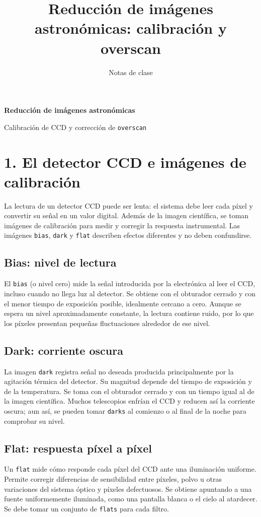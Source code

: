 \documentclass[11pt]{article}
\title{Reducción de imágenes astronómicas: calibración y overscan}
\author{Notas de clase}
\date{}
\begin{document}
\begin{center}
  {\Large\bfseries Reducción de imágenes astronómicas}\par
  {\normalsize Calibración de CCD y corrección de \texttt{overscan}}\par
\end{center}

\section*{1. El detector CCD e imágenes de calibración}

La lectura de un detector CCD puede ser lenta: el sistema debe leer cada píxel y
convertir su señal en un valor digital. Además de la imagen científica, se toman
imágenes de calibración para medir y corregir la respuesta instrumental. Las
imágenes \texttt{bias}, \texttt{dark} y \texttt{flat} describen efectos
diferentes y no deben confundirse.

\subsection*{Bias: nivel de lectura}
El \texttt{bias} (o nivel cero) mide la señal introducida por la electrónica al
leer el CCD, incluso cuando no llega luz al detector. Se obtiene con el obturador
cerrado y con el menor tiempo de exposición posible, idealmente cercano a cero.
Aunque se espera un nivel aproximadamente constante, la lectura contiene ruido,
por lo que los píxeles presentan pequeñas fluctuaciones alrededor de ese nivel.

\begin{center}
  
\end{center}

\subsection*{Dark: corriente oscura}
La imagen \texttt{dark} registra señal no deseada producida principalmente por
la agitación térmica del detector. Su magnitud depende del tiempo de exposición
y de la temperatura. Se toma con el obturador cerrado y con un tiempo igual al
de la imagen científica. Muchos telescopios enfrían el CCD y reducen así la
corriente oscura; aun así, se pueden tomar \texttt{darks} al comienzo o al final
de la noche para comprobar su nivel.

\subsection*{Flat: respuesta píxel a píxel}
Un \texttt{flat} mide cómo responde cada píxel del CCD ante una iluminación
uniforme. Permite corregir diferencias de sensibilidad entre píxeles, polvo u
otras variaciones del sistema óptico y píxeles defectuosos. Se obtiene
apuntando a una fuente uniformemente iluminada, como una pantalla blanca o el
cielo al atardecer. Se debe tomar un conjunto de \texttt{flats} para cada filtro.
\end{document}
